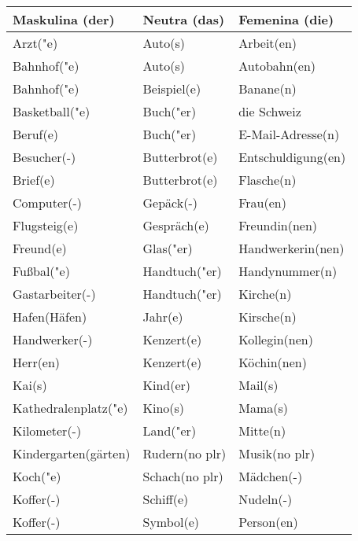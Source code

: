 \documentclass{article}
\renewcommand{\arraystretch}{1}
\begin{document}
\begin{table}[h!]
    \centering
    \label{tab:tabla1}
    \renewcommand{\arraystretch}{1.5}
    \begin{tabular}{|>{\raggedright\arraybackslash}p{5cm}|>{\raggedright\arraybackslash}p{5cm}|>{\raggedright\arraybackslash}p{5cm}|}
        \hline
        \rowcolor{gray!20} \textbf{Maskulina (der)} & \textbf{Neutra (das)} & \textbf{Femenina (die)} \\
        \hline
        Arzt("e) & Auto(s) & Arbeit(en) \\\hline
        Bahnhof("e) & Auto(s) & Autobahn(en) \\\hline
        Bahnhof("e) & Beispiel(e) & Banane(n) \\\hline
        Basketball("e) & Buch("er) & die Schweiz \\\hline
        Beruf(e) & Buch("er) & E-Mail-Adresse(n) \\\hline
        Besucher(-) & Butterbrot(e) & Entschuldigung(en) \\\hline
        Brief(e) & Butterbrot(e) & Flasche(n) \\\hline
        Computer(-) & Gepäck(-) & Frau(en) \\\hline
        Flugsteig(e) & Gespräch(e) & Freundin(nen) \\\hline
        Freund(e) & Glas("er) & Handwerkerin(nen) \\\hline
        Fu\ss{}bal("e) & Handtuch("er) & Handynummer(n) \\\hline
        Gastarbeiter(-) & Handtuch("er) & Kirche(n) \\\hline
        Hafen(Häfen) & Jahr(e) & Kirsche(n) \\\hline
        Handwerker(-) & Kenzert(e) & Kollegin(nen) \\\hline
        Herr(en) & Kenzert(e) & Köchin(nen) \\\hline
        Kai(s) & Kind(er) & Mail(s) \\\hline
        Kathedralenplatz("e) & Kino(s) & Mama(s) \\\hline
        Kilometer(-) & Land("er) & Mitte(n) \\\hline
        Kindergarten(gärten) & Rudern(no plr) & Musik(no plr) \\\hline
        Koch("e) & Schach(no plr) & Mädchen(-) \\\hline
        Koffer(-) & Schiff(e) & Nudeln(-) \\\hline
        Koffer(-) & Symbol(e) & Person(en) \\\hline

\end{tabular}
\end{table}
\end{document}
